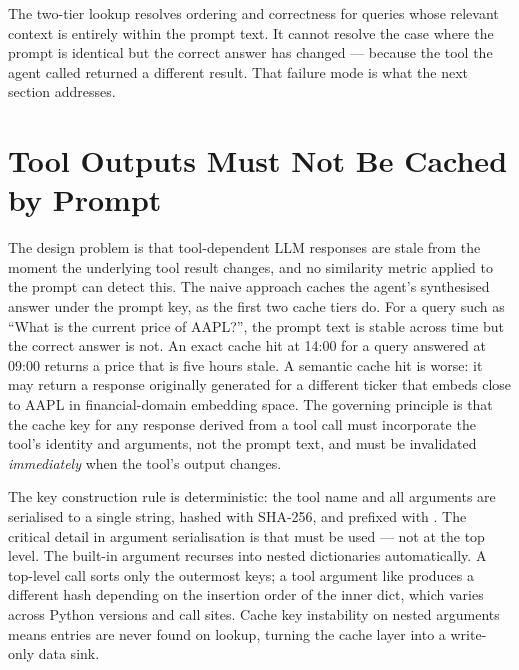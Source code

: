 The two-tier lookup resolves ordering and correctness for queries whose
relevant context is entirely within the prompt text. It cannot resolve
the case where the prompt is identical but the correct answer has changed
--- because the tool the agent called returned a different result. That
failure mode is what the next section addresses.


\section{Tool Outputs Must Not Be Cached by Prompt}
\label{sec:cache-invalidation}

The design problem is that tool-dependent LLM responses are stale from
the moment the underlying tool result changes, and no similarity metric
applied to the prompt can detect this. The naive approach caches the
agent's synthesised answer under the prompt key, as the first two cache
tiers do. For a query such as ``What is the current price of AAPL?'',
the prompt text is stable across time but the correct answer is not. An
exact cache hit at 14:00 for a query answered at 09:00 returns a price
that is five hours stale. A semantic cache hit is worse: it may return a
response originally generated for a different ticker that embeds close to
AAPL in financial-domain embedding space. The governing principle is that
the cache key for any response derived from a tool call must incorporate
the tool's identity and arguments, not the prompt text, and must be
invalidated \emph{immediately} when the tool's output changes.

The key construction rule is deterministic: the tool name and all
arguments are serialised to a single string, hashed with SHA-256, and
prefixed with . The critical detail in argument
serialisation is that  must
be used --- not  at the top level. The
built-in  argument recurses into nested
dictionaries automatically. A top-level  call sorts only
the outermost keys; a tool argument like
produces a different hash depending on the insertion order of the inner
dict, which varies across Python versions and call sites. Cache key
instability on nested arguments means entries are never found on lookup,
turning the cache layer into a write-only data sink.

